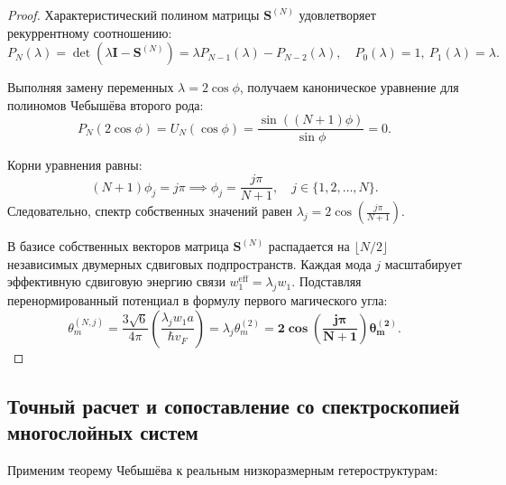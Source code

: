 \documentclass[12pt,a4paper]{article}
\begin{document}
\begin{proof}
	Характеристический полином матрицы $\mathbf{S}^{(N)}$ удовлетворяет рекуррентному соотношению:
	\begin{equation}
		P_N(\lambda) = \det(\lambda \mathbf{I} - \mathbf{S}^{(N)}) = \lambda P_{N-1}(\lambda) - P_{N-2}(\lambda), \quad P_0(\lambda) = 1, \ P_1(\lambda) = \lambda.
	\end{equation}
	
	Выполняя замену переменных $\lambda = 2 \cos\phi$, получаем каноническое уравнение для полиномов Чебышёва второго рода:
	\begin{equation}
		P_N(2\cos\phi) = U_N(\cos\phi) = \frac{\sin((N+1)\phi)}{\sin\phi} = 0.
	\end{equation}
	
	Корни уравнения равны:
	\begin{equation}
		(N+1)\phi_j = j \pi \implies \phi_j = \frac{j \pi}{N+1}, \quad j \in \{1, 2, \dots, N\}.
	\end{equation}
	Следовательно, спектр собственных значений равен $\lambda_j = 2 \cos\left(\frac{j\pi}{N+1}\right)$.
	
	В базисе собственных векторов матрица $\mathbf{S}^{(N)}$ распадается на $\lfloor N/2 \rfloor$ независимых двумерных сдвиговых подпространств. Каждая мода $j$ масштабирует эффективную сдвиговую энергию связи $w_1^{\text{eff}} = \lambda_j w_1$. Подставляя перенормированный потенциал в формулу первого магического угла:
	\begin{equation}
		\theta_m^{(N, j)} = \frac{3\sqrt{6}}{4\pi} \left( \frac{\lambda_j w_1 a}{\hbar v_F} \right) = \lambda_j \theta_m^{(2)} = \mathbf{2 \cos\left( \frac{j \pi}{N+1} \right) \theta_m^{(2)}}.
	\end{equation}
\end{proof}

\subsection{Точный расчет и сопоставление со спектроскопией многослойных систем}
Применим теорему Чебышёва к реальным низкоразмерным гетероструктурам:
\end{document}
